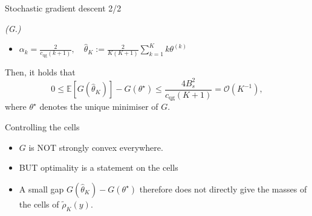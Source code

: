 \documentclass[aspectratio=169]{beamer} %
\begin{document}
	
	
	\begin{frame}[t]{Stochastic gradient descent 2/2}
		\begin{mythm*}{\itshape (G.)}
			\begin{itemize}
				\item $\alpha_k = \frac{2}{c_{\mathrm{qg}}(k+1)},\quad \hat\theta_K := \frac{2}{K(K+1)}\sum_{k=1}^K k\theta^{(k)}$
			\end{itemize}
			Then, it holds that
			\begin{equation*}
				0\leq \mathbb E [G(\hat\theta_K)] - G(\theta^\star) \leq \frac{4B_s^2}{c_{\mathrm{qg}}(K+1)}=\mathcal O(K^{-1}),
			\end{equation*}
			where $\theta^\star$ denotes the unique minimiser of $G$.
		\end{mythm*}
	\end{frame}
	
	\begin{frame}[t]{Controlling the cells}
		\begin{itemize}[<+->]
			\item $G$ is NOT strongly convex everywhere.
			\vspace{\baselineskip}
			\item BUT optimality is a statement on the cells
			\vspace{\baselineskip}
			\item A small gap $G(\hat\theta_K)-G(\theta^\star)$ therefore does not directly give the masses of the cells of $\tilde\rho_K(y)$.
		\end{itemize}
		\vspace{.3\baselineskip}
	\end{frame}
	
\end{document}

